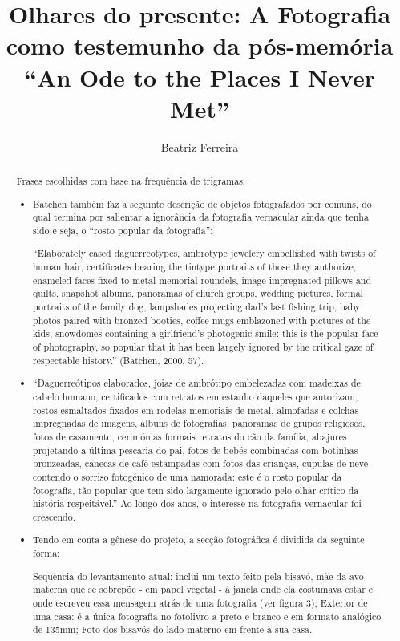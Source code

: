 \documentclass{article}
\title{Olhares do presente: A Fotografia como testemunho da pós-memória  
“An Ode to the Places I Never Met”}
\author{Beatriz Ferreira}
\begin{document}
\maketitle

\begin{abstract}
Frases escolhidas com base na frequência de trigramas:
\begin{itemize}
\item Batchen também faz a seguinte descrição de objetos fotografados por comuns, do 
qual termina por salientar a ignorância da fotografia vernacular ainda que tenha sido e 
seja, o “rosto popular da fotografia”: 

“Elaborately cased daguerreotypes, ambrotype jewelery embellished with twists 
of human hair, certificates bearing the tintype portraits of those they authorize, enameled 
faces fixed to metal memorial roundels, image-impregnated pillows and quilts, snapshot 
albums, panoramas of church groups, wedding pictures, formal portraits of the family 
dog,  lampshades  projecting  dad’s  last  fishing  trip,  baby  photos  paired  with  bronzed 
booties,  coffee  mugs  emblazoned  with  pictures  of  the  kids,  snowdomes  containing  a 
girlfriend’s photogenic smile: this is the popular face of photography, so popular that it 
has been largely ignored by the critical gaze of respectable history.” (Batchen, 2000, 57).
\item “Daguerreótipos elaborados, joias de ambrótipo embelezadas com madeixas de cabelo humano, certificados com retratos em estanho daqueles que autorizam, rostos esmaltados fixados em rodelas memoriais de metal, almofadas e colchas impregnadas de imagens, álbuns de fotografias, panoramas de grupos religiosos, fotos de casamento, cerimónias formais retratos do cão da família, abajures projetando a última pescaria do pai, fotos de bebés combinadas com botinhas bronzeadas, canecas de café estampadas com fotos das crianças, cúpulas de neve contendo o sorriso fotogénico de uma namorada: este é o rosto popular da fotografia, tão popular que tem sido largamente ignorado pelo olhar crítico da história respeitável.”   
Ao longo dos anos, o interesse na fotografia vernacular foi crescendo.
\item Tendo em conta a gênese do projeto, a secção fotográfica é dividida da 
seguinte forma:  
 
   Sequência do levantamento atual: inclui um texto feito pela bisavó, mãe da avó 
materna que se sobrepõe - em papel vegetal - à janela onde ela costumava estar 
e onde escreveu essa mensagem atrás de uma fotografia (ver figura 3); 
   Exterior  de  uma  casa:  é  a  única  fotografia  no  fotolivro  a  preto  e  branco  e  em 
formato analógico de 135mm; 
   Foto dos bisavós do lado materno em frente à sua casa.
 
\end{itemize}
\end{abstract}
\end{document}
